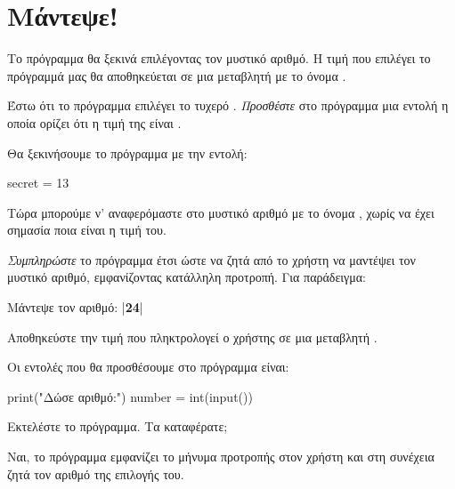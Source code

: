 \documentclass[a4paper,11pt,oneside]{book}
\begin{document}
\worksheettrue
\solutionstrue
{}

\section{Μάντεψε!}

\begin{step}
\label{step:secret-assign}
Το πρόγραμμα θα ξεκινά επιλέγοντας τον μυστικό αριθμό. 
Η τιμή που επιλέγει το πρόγραμμά μας θα αποθηκεύεται σε μια μεταβλητή με το όνομα .

Έστω ότι το πρόγραμμα επιλέγει το τυχερό .
\emph{Προσθέστε} στο πρόγραμμα μια εντολή η οποία ορίζει ότι η τιμή της  είναι .

\begin{answer}
Θα ξεκινήσουμε το πρόγραμμα με την εντολή:

\begin{pynew}
secret = 13
\end{pynew}
\end{answer}

Τώρα μπορούμε ν' αναφερόμαστε στο μυστικό αριθμό με το όνομα , χωρίς να έχει σημασία ποια είναι η τιμή του.
\end{step}

\begin{step}
\label{step:number-input}
\emph{Συμπληρώστε} το πρόγραμμα έτσι ώστε να ζητά από το χρήστη να μαντέψει τον μυστικό αριθμό, εμφανίζοντας κατάλληλη προτροπή.
Για παράδειγμα:

\marginnote[24pt]{\iconcomputer\hspace{1ex}\iconkeyboard}
\begin{pyterm}
Μάντεψε τον αριθμό:
|\textbf{24}|
\end{pyterm}

Αποθηκεύστε την τιμή που πληκτρολογεί ο χρήστης σε μια μεταβλητή .

\begin{answer}
Οι εντολές που θα προσθέσουμε στο πρόγραμμα είναι:

\begin{pynew}
print("Δώσε αριθμό:")
number = int(input())
\end{pynew}
\end{answer}

Εκτελέστε το πρόγραμμα. Τα καταφέρατε;

\begin{answer}
Ναι, το πρόγραμμα εμφανίζει το μήνυμα προτροπής στον χρήστη και στη συνέχεια ζητά τον αριθμό της επιλογής του.
\end{answer}
\end{step}
\end{document}
